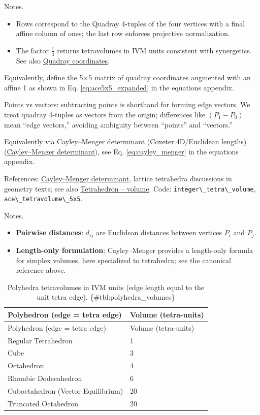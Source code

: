 \documentclass[
  10pt,
]{article}
\newcommand{\passthrough}[1]{#1}
\providecommand{\tightlist}{%
  \setlength{\itemsep}{0pt}\setlength{\parskip}{0pt}}
\begin{document}
Notes.

\begin{itemize}
\tightlist
\item
  Rows correspond to the Quadray 4-tuples of the four vertices with a
  final affine column of ones; the last row enforces projective
  normalization.
\item
  The factor \(\tfrac{1}{4}\) returns tetravolumes in IVM units
  consistent with synergetics. See also
  \href{https://en.wikipedia.org/wiki/Quadray_coordinates}{Quadray
  coordinates}.
\end{itemize}

Equivalently, define the 5×5 matrix of quadray coordinates augmented
with an affine 1 as shown in Eq. \eqref{eq:ace5x5_expanded} in the
equations appendix.

Points vs vectors: subtracting points is shorthand for forming edge
vectors. We treat quadray 4-tuples as vectors from the origin;
differences like \((P_1-P_0)\) mean ``edge vectors,'' avoiding ambiguity
between ``points'' and ``vectors.''

Equivalently via Cayley--Menger determinant (Coxeter.4D/Euclidean
lengths)
(\href{https://en.wikipedia.org/wiki/Cayley\%E2\%80\%93Menger_determinant}{Cayley--Menger
determinant}), see Eq. \eqref{eq:cayley_menger} in the equations
appendix.

References:
\href{https://en.wikipedia.org/wiki/Cayley\%E2\%80\%93Menger_determinant}{Cayley--Menger
determinant}, lattice tetrahedra discussions in geometry texts; see also
\href{https://en.wikipedia.org/wiki/Tetrahedron\#Volume}{Tetrahedron --
volume}. Code: \passthrough{\lstinline!integer\_tetra\_volume!},
\passthrough{\lstinline!ace\_tetravolume\_5x5!}.

Notes.

\begin{itemize}
\tightlist
\item
  \textbf{Pairwise distances}: \(d_{ij}\) are Euclidean distances
  between vertices \(P_i\) and \(P_j\).
\item
  \textbf{Length-only formulation}: Cayley--Menger provides a
  length-only formula for simplex volumes, here specialized to
  tetrahedra; see the canonical reference above.
\end{itemize}

\begin{longtable}[]{@{}ll@{}}
\caption{Polyhedra tetravolumes in IVM units (edge length equal to the
unit tetra edge). \{\#tbl:polyhedra\_volumes\}}\tabularnewline
\toprule
Polyhedron (edge = tetra edge) & Volume (tetra-units)\tabularnewline
\midrule
\endfirsthead
\toprule
Polyhedron (edge = tetra edge) & Volume (tetra-units)\tabularnewline
\midrule
\endhead
Regular Tetrahedron & 1\tabularnewline
Cube & 3\tabularnewline
Octahedron & 4\tabularnewline
Rhombic Dodecahedron & 6\tabularnewline
Cuboctahedron (Vector Equilibrium) & 20\tabularnewline
Truncated Octahedron & 20\tabularnewline
\bottomrule
\end{longtable}
\end{document}
